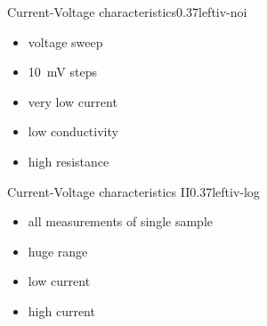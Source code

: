 \documentclass[hyperref={pdfpagelabels=false}, aspectratio=43, t]{beamer}  %
\begin{document}
\begin{graphicsFrame}{Current-Voltage characteristics}{}{0.37}{left}{iv-noi}{}
	\vspace{2em}
	\begin{itemize}
		\item voltage sweep
		\vspace{.5em}
		\item 10\SI{}{\milli\volt} steps
		\vspace{.5em}
		\item very low current 
		\vspace{.5em}
		\item low conductivity 
		\vspace{.5em}
		\item high resistance 
	\end{itemize}
\end{graphicsFrame}
\begin{graphicsFrame}{Current-Voltage characteristics II}{}{0.37}{left}{iv-log}{}
	\vspace{2em}
	\begin{itemize}
		\item all measurements of single sample
		\vspace{.5em}
		\item huge range 
		\vspace{.5em}
		\item low current
		\vspace{.5em}
		\item high current
	\end{itemize}
\end{graphicsFrame}
\end{document}
